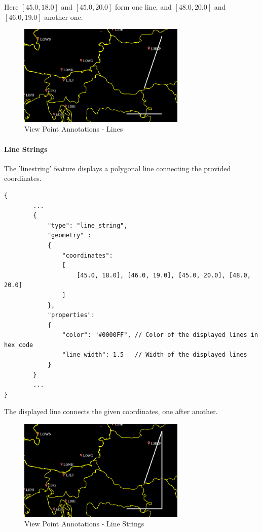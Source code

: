 Here $[45.0, 18.0]$ and $[45.0, 20.0]$ form one line, and $[48.0, 20.0]$ and $[46.0, 19.0]$ another one.

\begin{figure}[H]
    \center
        \includegraphics[width=8cm]{figures/viewpoints_anno_example_lines.png}
    \caption{View Point Annotations - Lines} 
\end{figure}

\paragraph{Line Strings} The 'line\textunderscore string' feature displays a polygonal line connecting the provided coordinates.

\begin{lstlisting}[basicstyle=\small\ttfamily]
{
        ...
        {
            "type": "line_string",
            "geometry" :
            {
                "coordinates": 
                [
                    [45.0, 18.0], [46.0, 19.0], [45.0, 20.0], [48.0, 20.0]
                ]
            },
            "properties":
            {
                "color": "#0000FF", // Color of the displayed lines in hex code
                "line_width": 1.5   // Width of the displayed lines
            }
        }
        ...
}
\end{lstlisting}

The displayed line connects the given coordinates, one after another.

\begin{figure}[H]
    \center
        \includegraphics[width=8cm]{figures/viewpoints_anno_example_linestring.png}
    \caption{View Point Annotations - Line Strings} 
\end{figure}

